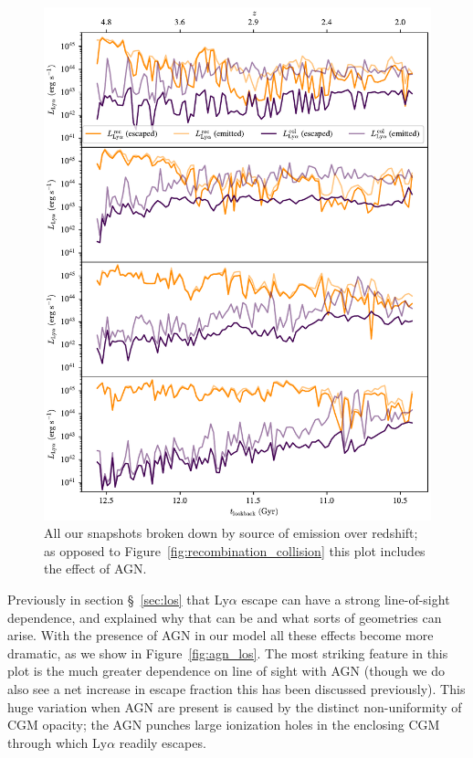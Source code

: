 \begin{figure}
    \centering
    \includegraphics[width=\textwidth,height=\textheight,keepaspectratio]{figures/agn_recombination_collision.pdf}
    \caption{
        All our snapshots broken down by source of emission over redshift; as opposed to Figure~\ref{fig:recombination_collision} this plot includes the effect of AGN.
    }
    \label{fig:agn_recombination_collision}
\end{figure}

Previously in section \S~\ref{sec:los} that Ly$\alpha$ escape can have a strong line-of-sight dependence, and explained why that can be and what sorts of geometries can arise.
With the presence of AGN in our model all these effects become more dramatic, as we show in Figure~\ref{fig:agn_los}.
The most striking feature in this plot is the much greater dependence on line of sight with AGN (though we do also see a net increase in escape fraction this has been discussed previously).
This huge variation when AGN are present is caused by the distinct non-uniformity of CGM opacity;  the AGN punches large ionization holes in the enclosing CGM through which Ly$\alpha$ readily escapes.


